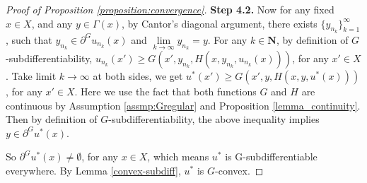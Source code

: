\documentclass[a4paper, 11pt]{amsart}
\numberwithin{equation}{section}
\theoremstyle{plain}
\theoremstyle{definition}
\theoremstyle{remark}
\newcommand{\N}{\mathbf{N}}
\begin{document}
\begin{proof}[Proof of Proposition \ref{proposition:convergence}]
	
	{\bf Step 4.2.} Now for any fixed $x\in X$, and any $y\in \Gamma(x)$, by Cantor's diagonal argument, there exists $\{y_{n_k}\}_{k=1}^{\infty}$, such that $y_{n_k} \in \partial^G u_{n_k}(x)$ and $\lim\limits_{k\longrightarrow \infty} y_{n_k} = y$.
	For any $k\in \N$, by definition of $G$-subdifferentiability,
	$u_{n_k}(x')\ge G(x', y_{n_k}, H(x, y_{n_k}, u_{n_k}(x)))$, for any $x' \in X$. Take limit $k \longrightarrow \infty$ at both sides, we get $u^*(x') \ge G(x', y, H(x, y, u^*(x)))$, for any $x'\in X$. Here we use the fact that both functions $G$ and
		$H$ are continuous by Assumption \ref{assmp:Gregular} and Proposition \ref{lemma_continuity}.
Then by definition of $G$-subdifferentiability, the above inequality implies $y\in \partial ^G u^*(x)$. 

	So $\partial^G u^*(x)\neq \emptyset$, for any $x\in X$, which means $u^*$ is G-subdifferentiable everywhere. By Lemma \ref{convex-subdiff}, $u^*$ is $G$-convex.
\end{proof}

\vspace{0.3cm}
\end{document}
